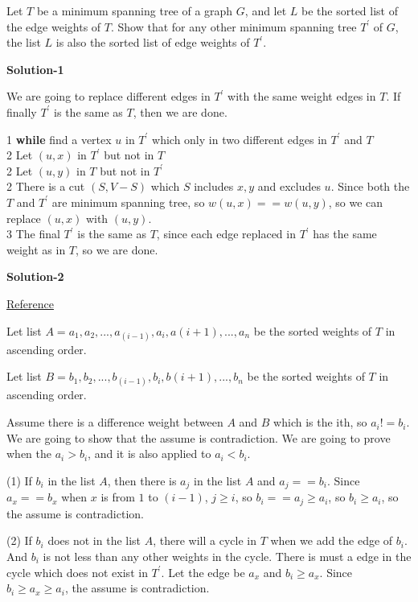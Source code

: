 Let $T$ be a minimum spanning tree of a graph $G$, and let $L$ be the sorted
list of the edge weights of $T$. Show that for any other minimum spanning tree
$T^{'}$ of $G$, the list $L$ is also the sorted list of edge weights of $T^{'}$.

\textbf{Solution-1}

We are going to replace different edges in $T^{'}$ with the same weight edges
in $T$. If finally $T^{'}$ is the same as $T$, then we are done.

1 \space \textbf{while} find a vertex $u$ in $T^{'}$ which only in two different
edges in $T^{'}$ and $T$ \\
2 \space \space \space Let $(u, x)$ in $T^{'}$ but not in $T$ \\
2 \space \space \space Let $(u, y)$ in $T$ but not in $T^{'}$ \\
2 \space \space \space There is a cut $(S, V - S)$ which $S$ includes $x, y$ and
excludes $u$. Since both the $T$ and $T^{'}$ are minimum spanning tree, so
$w(u, x) == w(u, y)$, so we can replace $(u, x)$ with $(u, y)$.\\
3 \space The final $T^{'}$ is the same as $T$, since each edge replaced in $T^{'}$
has the same weight as in $T$, so we are done.

\textbf{Solution-2}

\href{https://github.com/gzc/CLRS/}{Reference}

Let list $A = { a_1, a_2, ... , a_(i-1), a_i, a(i+1), ..., a_n }$ be the sorted
weights of $T$ in ascending order.

Let list $B = { b_1, b_2, ... , b_(i-1), b_i, b(i+1), ..., b_n }$ be the sorted
weights of $T$ in ascending order.

Assume there is a difference weight between $A$ and $B$ which is the ith, so
$a_i != b_i$. We are going to show that the assume is contradiction. We are
going to prove when the $a_i > b_i$, and it is also applied to $a_i < b_i$.

(1) If $b_i$ in the list $A$, then there is $a_j$ in the list $A$ and
$a_j == b_i$. Since $a_x == b_x$ when $x$ is from $1$ to $(i - 1)$, $j \geq i$,
so $b_i == a_j \geq a_i$, so $b_i \geq a_i$, so the assume is contradiction.

(2) If $b_i$ does not in the list $A$, there will a cycle in $T$ when we add
the edge of $b_i$. And $b_i$ is not less than any other weights in the cycle.
There is must a edge in the cycle which does not exist in $T^{'}$. Let the edge
be $a_x$ and $b_i \geq a_x$. Since $b_i \geq a_x \geq a_i$, the assume is
contradiction.

